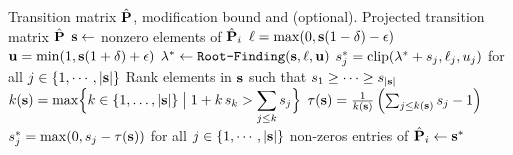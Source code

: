 \documentclass[sigconf, anonymous, review]{acmart}
\begin{document}
\begin{algorithm}[t]
	\caption{\label{alg:project}\project: projection to feasible set}
	\begin{algorithmic}[1]
		\REQUIRE Transition matrix $\hat{\mathbf{{P}}}$, modification bound \boundfactor and \absboundfactor (optional).
		\ENSURE Projected transition matrix $\hat{\mathbf{{P}}}$
            \STATE $\mathbf{{s}} \gets$ nonzero elements of $\hat{\mathbf{{P}}}_i$
        \STATE $\mathbf{{\ell}} = \max(0, \mathbf{{s}}(1-\delta) - \epsilon)$ \label{algoline:simplex_box_start}
        \STATE $\mathbf{{u}} = \min(1, \mathbf{{s}}(1+\delta) + \epsilon)$
        \STATE $\lambda^{*} \gets {\texttt{Root-Finding}}(\mathbf{{s}}, \mathbf{{\ell}}, \mathbf{{u}})$ \label{algoline:root_finding}
        \STATE $s^{*}_j = \text{clip} (\lambda^{*} + s_j, \ell_j, u_j)$ for all $j \in \{1, \cdots, |\mathbf{{s}}|\}$ \label{algoline:simplex_box_end}
		\ELSE
		\STATE Rank elements in $\mathbf{{s}}$ such that $s_1 \geq \cdots \geq s_{|\mathbf{{s}}|}$ \label{algline:simplex_start}
        \STATE $k(\mathbf{{s}}) = \displaystyle \max \Bigl\{ k \in \{1, \dots, |\mathbf{{s}}|\} \;\big|\; 1 + k\, s_k > \sum_{j \leq k} s_j \Bigr\}$
        \STATE $\tau(\mathbf{{s}}) = \frac{1}{k(\mathbf{{s}})} \left(\sum_{j \leq k(\mathbf{{s}})} s_j -1\right)$
        \STATE $s_j^{*} = \max(0,s_j - \tau(\mathbf{{s}}))$ for all $j \in \{1, \cdots, |\mathbf{{s}}|\}$
        \label{algline:simplex_end}
	\ENDIF
        \STATE non-zeros entries of $\hat{\mathbf{{P}}}_i \gets \mathbf{{s}}^{*}$
        \ENDFOR
	\end{algorithmic}
\end{algorithm}

\end{document}
